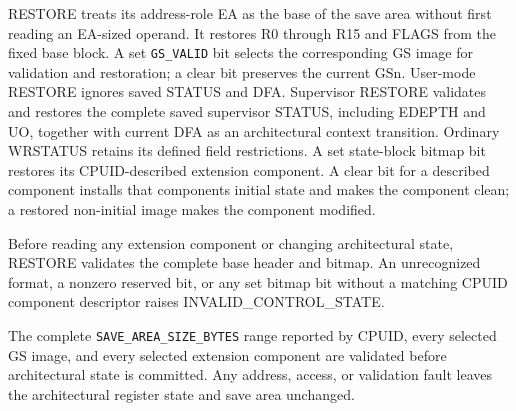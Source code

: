 RESTORE treats its address-role EA as the base of the save area without first reading an EA-sized operand. It restores R0 through R15 and FLAGS from the fixed base block. A set \texttt{GS\_VALID} bit selects the corresponding GS image for validation and restoration; a clear bit preserves the current GSn. User-mode RESTORE ignores saved STATUS and DFA. Supervisor RESTORE validates and restores the complete saved supervisor STATUS, including EDEPTH and UO, together with current DFA as an architectural context transition. Ordinary WRSTATUS retains its defined field restrictions. A set state-block bitmap bit restores its CPUID-described extension component. A clear bit for a described component installs that component\textquotesingle{}s initial state and makes the component clean; a restored non-initial image makes the component modified.

Before reading any extension component or changing architectural state, RESTORE validates the complete base header and bitmap. An unrecognized format, a nonzero reserved bit, or any set bitmap bit without a matching CPUID component descriptor raises INVALID\_CONTROL\_STATE.

The complete \texttt{SAVE\_AREA\_SIZE\_BYTES} range reported by CPUID, every selected GS image, and every selected extension component are validated before architectural state is committed. Any address, access, or validation fault leaves the architectural register state and save area unchanged.
